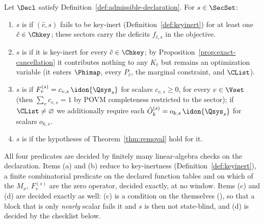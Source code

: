 \begin{definition}\label{def:classes}
Let $\Decl$ satisfy Definition~\ref{def:admissible-declaration}. For $s\in\SecSet$:
\begin{enumerate}[label=(\alph*),leftmargin=2.2em]
\item $s$ is  if $(\hat c,s)$ fails to be key-inert
(Definition~\ref{def:keyinert}) for at least one $\hat c\in\Chkey$; these
sectors carry the deficits $f_{\hat c,s}$ in the objective.
\item $s$ is  if it is key-inert for every
$\hat c\in\Chkey$; by Proposition~\ref{prop:exact-cancellation} it contributes nothing to
any $K_{\hat c}$ but remains an optimization variable (it enters
$\Phimap$, every $P_{\hat c}$, the marginal constraint, and $\CList$).
\item $s$ is  if $F^{(s)}_v=c_{v,s}\,\idon{\Qsys_s}$ for
scalars $c_{v,s}\ge0$, for every $v\in\Vset$ (then
$\sum_vc_{v,s}=1$ by POVM completeness restricted to the sector); if
$\CList\neq\varnothing$ we additionally require each
$\hat O_k^{(s)}=o_{k,s}\,\idon{\Qsys_s}$ for scalars $o_{k,s}$.
\item $s$ is  if the hypotheses of
Theorem~\ref{thm:removal} hold for it.
\end{enumerate}
All four predicates are decided by finitely many linear-algebra checks on
the declaration. Items (a) and (b) reduce to key-inertness
(Definition~\ref{def:keyinert}), a finite combinatorial predicate on the
declared function tables and on which of the $M_x$, $F^{(s)}_v$ are the zero
operator, decided exactly, at no window. Items (c) and (d) are decided
exactly as well: (c) is a condition on the
 themselves
(), so that a block that is only
\emph{nearly} scalar fails it and $s$ is then not state-blind, and (d) is
decided by the checklist below.


\end{definition}
